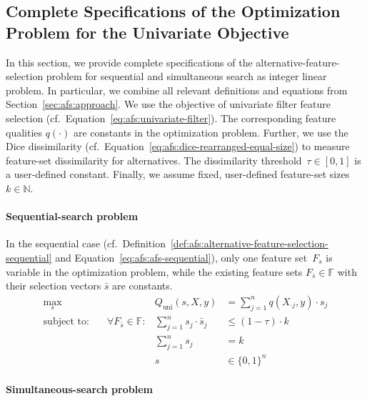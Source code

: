 \documentclass{article}
\theoremstyle{definition}
\begin{document}
\subsection{Complete Specifications of the Optimization Problem for the Univariate Objective}
\label{sec:afs:appendix:univariate-complete-optimization-problem}

In this section, we provide complete specifications of the alternative-feature-selection problem for sequential and simultaneous search as integer linear problem.
In particular, we combine all relevant definitions and equations from Section~\ref{sec:afs:approach}.
We use the objective of univariate filter feature selection (cf.~Equation~\ref{eq:afs:univariate-filter}).
The corresponding feature qualities $q(\cdot)$ are constants in the optimization problem.
Further, we use the Dice dissimilarity (cf.~Equation~\ref{eq:afs:dice-rearranged-equal-size}) to measure feature-set dissimilarity for alternatives.
The dissimilarity threshold~$\tau \in [0,1]$ is a user-defined constant.
Finally, we assume fixed, user-defined feature-set sizes~$k \in \mathbb{N}$.

\paragraph{Sequential-search problem}

In the sequential case (cf.~Definition~\ref{def:afs:alternative-feature-selection-sequential} and Equation~\ref{eq:afs:afs-sequential}), only one feature set~$F_s$ is variable in the optimization problem, while the existing feature sets $F_{\bar{s}} \in \mathbb{F}$ with their selection vectors $\bar{s}$ are constants.
%
\begin{equation}
	\begin{aligned}
		\max_s &\quad & Q_{\text{uni}}(s,X,y) &= \sum_{j=1}^{n} q(X_{\cdot{}j},y) \cdot s_j \\
		\text{subject to:} &\quad \forall F_{\bar{s}} \in \mathbb{F}: & \sum_{j=1}^n s_j \cdot \bar{s}_j &\leq (1 - \tau) \cdot k \\
		&\quad & \sum_{j=1}^n s_j &= k \\
		&\quad & s &\in \{0,1\}^n
	\end{aligned}
	\label{eq:afs:afs-sequential-complete}
\end{equation}
%
\paragraph{Simultaneous-search problem}
\end{document}
